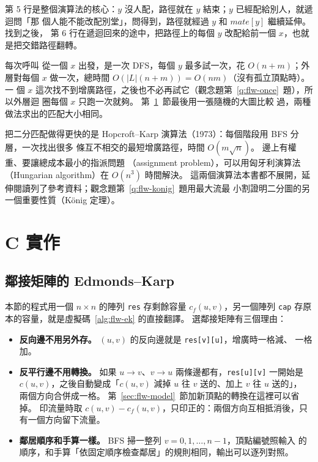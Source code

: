 第 5 行是整個演算法的核心：$y$ 沒人配，路徑就在 $y$ 結束；$y$ 已經配給別人，就遞迴問「那
個人能不能改配別堂」，問得到，路徑就經過 $y$ 和 $\mathit{mate}[y]$ 繼續延伸。 找到之後，
第 6 行在遞迴回來的途中，把路徑上的每個 $y$ 改配給前一個 $x$，也就是把交錯路徑翻轉。

每次呼叫  從一個 $x$ 出發，是一次 DFS，每個 $y$ 最多試一次，花
$O(n + m)$；外層對每個 $x$ 做一次，總時間 $O(|L|(n + m)) = O(nm)$（沒有孤立頂點時）。 一
個 $x$ 這次找不到增廣路徑，之後也不必再試它（觀念題第~\ref{q:flw-once}~題），所以外層迴
圈每個 $x$ 只跑一次就夠。 第~\ref{sec:flw-c}~節最後用一張隨機的大圖比較
過，兩種做法求出的匹配大小相同。

把二分匹配做得更快的是 Hopcroft--Karp 演算法（1973）：每個階段用 BFS 分層，一次找出很多
條互不相交的最短增廣路徑，時間 $O(m\sqrt{n})$。 邊上有權重、要讓總成本最小的指派問題
（assignment problem），可以用匈牙利演算法（Hungarian algorithm）在 $O(n^3)$ 時間解決。
這兩個演算法本書都不展開，延伸閱讀列了參考資料；觀念題第~\ref{q:flw-konig}~題用最大流最
小割證明二分圖的另一個重要性質（König 定理）。

\section{C 實作}
\label{sec:flw-c}

\subsection{鄰接矩陣的 Edmonds--Karp}

本節的程式用一個 $n \times n$ 的陣列 \texttt{res} 存剩餘容量 $c_f(u, v)$，另一個陣列
\texttt{cap} 存原本的容量，就是虛擬碼~\ref{alg:flw-ek} 的直接翻譯。 選鄰接矩陣有三個理由：

\begin{itemize}
\item \textbf{反向邊不用另外存。} $(u, v)$ 的反向邊就是 \texttt{res[v][u]}，增廣時一格減、
一格加。
\item \textbf{反平行邊不用轉換。} 如果 $u \to v$、$v \to u$ 兩條邊都有，\texttt{res[u][v]}
一開始是 $c(u, v)$，之後自動變成「$c(u, v)$ 減掉 $u$ 往 $v$ 送的、加上 $v$ 往 $u$ 送的」，
兩個方向合併成一格。 第~\ref{sec:flw-model}~節加新頂點的轉換在這裡可以省掉。 印流量時取
$c(u, v) - c_f(u, v)$，只印正的：兩個方向互相抵消後，只有一個方向留下流量。
\item \textbf{鄰居順序和手算一樣。} BFS 掃一整列 $v = 0, 1, \ldots, n - 1$，頂點編號照輸入
的順序，和手算「依固定順序檢查鄰居」的規則相同，輸出可以逐列對照。
\end{itemize}

